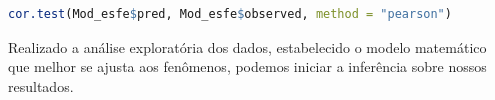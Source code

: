    \lstset{
 	language=R, %
 	caption= Teste de correlação em linguagem R,} %
 \begin{lstlisting}[language=R]
 	cor.test(Mod_esfe$pred, Mod_esfe$observed, method = "pearson")
 \end{lstlisting} 
 
 
\hspace*{1.25 cm} Realizado a análise exploratória dos dados, estabelecido o modelo matemático que melhor se ajusta aos  fenômenos, podemos iniciar a inferência sobre nossos resultados. 
%   

